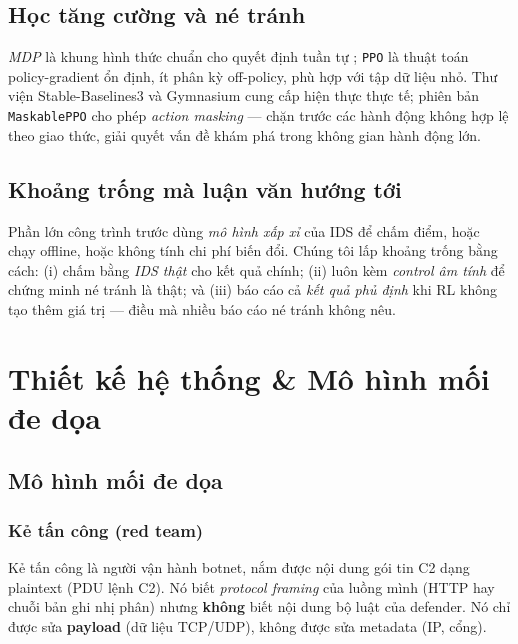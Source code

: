 \documentclass[12pt,a4paper]{report}
\newcommand{\PPO}{\texttt{PPO}}
\newcommand{\MDP}{\textit{MDP}}
\begin{document}
\section{Học tăng cường và né tránh}

\MDP{} là khung hình thức chuẩn cho quyết định tuần tự \citep{puterman1994markov};
\PPO{} \citep{schulman2017proximal} là thuật toán policy-gradient ổn định, ít phân kỳ
off-policy, phù hợp với tập dữ liệu nhỏ. Thư viện Stable-Baselines3
\citep{stable_baselines3} và Gymnasium \citep{gymnasium} cung cấp hiện thực thực tế;
phiên bản \texttt{MaskablePPO} cho phép \emph{action masking} — chặn trước các hành
động không hợp lệ theo giao thức, giải quyết vấn đề khám phá trong không gian hành
động lớn.

\section{Khoảng trống mà luận văn hướng tới}

Phần lớn công trình trước dùng \emph{mô hình xấp xỉ} của IDS để chấm điểm, hoặc chạy
offline, hoặc không tính chi phí biến đổi. Chúng tôi lấp khoảng trống bằng cách:
(i) chấm bằng \emph{IDS thật} cho kết quả chính; (ii) luôn kèm \emph{control âm tính}
để chứng minh né tránh là thật; và (iii) báo cáo cả \emph{kết quả phủ định} khi RL
không tạo thêm giá trị — điều mà nhiều báo cáo né tránh không nêu.

\chapter{Thiết kế hệ thống \& Mô hình mối đe dọa}
\label{ch:design}

\section{Mô hình mối đe dọa}

\subsection{Kẻ tấn công (red team)}
Kẻ tấn công là người vận hành botnet, nắm được nội dung gói tin C2 dạng plaintext
(PDU lệnh C2). Nó biết \emph{protocol framing} của luồng mình (HTTP hay chuỗi bản ghi
nhị phân) nhưng \textbf{không} biết nội dung bộ luật của defender. Nó chỉ được sửa
\textbf{payload} (dữ liệu TCP/UDP), không được sửa metadata (IP, cổng).
\end{document}
